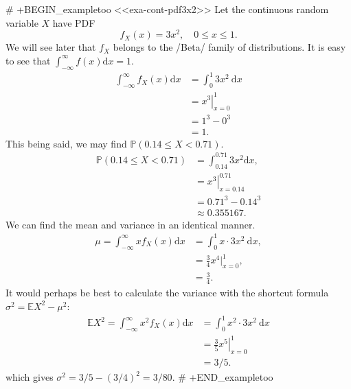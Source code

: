 # +BEGIN_exampletoo
<<exa-cont-pdf3x2>> Let the continuous random variable \(X\) have PDF
\[ f_{X}(x)=3x^{2},\quad 0\leq x\leq 1. \] We will see later that
\(f_{X}\) belongs to the /Beta/ family of distributions. It is easy to
see that \(\int_{-\infty}^{\infty}f(x)\mathrm{d} x=1\).
\begin{align*}
\int_{-\infty}^{\infty}f_{X}(x)\mathrm{d} x & =\int_{0}^{1}3x^{2}\:\mathrm{d} x\\
 & =\left.x^{3}\right|_{x=0}^{1}\\
 & =1^{3}-0^{3}\\
 & =1.
\end{align*}
This being said, we may find \(\mathbb{P}(0.14\leq X<0.71)\).
\begin{align*}
\mathbb{P}(0.14\leq X<0.71) & =\int_{0.14}^{0.71}3x^{2}\mathrm{d} x,\\
 & =\left.x^{3}\right|_{x=0.14}^{0.71}\\
 & =0.71^{3}-0.14^{3}\\
 & \approx0.355167.
\end{align*}
We can find the mean and variance in an identical manner.
\begin{align*}
\mu=\int_{-\infty}^{\infty}xf_{X}(x)\mathrm{d} x & =\int_{0}^{1}x\cdot3x^{2}\:\mathrm{d} x,\\
 & =\frac{3}{4}x^{4}|_{x=0}^{1},\\
 & =\frac{3}{4}.
\end{align*}
It would perhaps be best to calculate the variance with the shortcut
formula \(\sigma^{2}=\mathbb{E} X^{2}-\mu^{2}\):
\begin{align*}
\mathbb{E} X^{2}=\int_{-\infty}^{\infty}x^{2}f_{X}(x)\mathrm{d} x & =\int_{0}^{1}x^{2}\cdot3x^{2}\:\mathrm{d} x\\
 & =\left.\frac{3}{5}x^{5}\right|_{x=0}^{1}\\
 & =3/5.
\end{align*}
which gives \(\sigma^{2}=3/5-(3/4)^{2}=3/80\).
# +END_exampletoo


